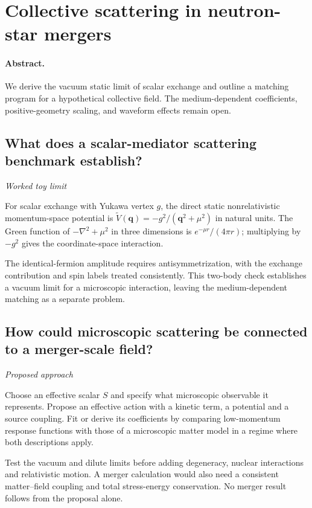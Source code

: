 \documentclass[11pt]{article}
\begin{document}
\section{Collective scattering in neutron-star mergers}
\paragraph{Abstract.} We derive the vacuum static limit of scalar exchange and outline a matching program for a hypothetical collective field. The medium-dependent coefficients, positive-geometry scaling, and waveform effects remain open.

\subsection{What does a scalar-mediator scattering benchmark establish?}
\label{problem:scalar-exchange}
\textit{Worked toy limit}

For scalar exchange with Yukawa vertex \(g\), the direct static nonrelativistic momentum-space potential is \(\widetilde V(\mathbf q)=-g^2/(\mathbf q^2+\mu^2)\) in natural units. The Green function of \(-\nabla^2+\mu^2\) in three dimensions is \(e^{-\mu r}/(4\pi r)\); multiplying by \(-g^2\) gives the coordinate-space interaction.

The identical-fermion amplitude requires antisymmetrization, with the exchange contribution and spin labels treated consistently. This two-body check establishes a vacuum limit for a microscopic interaction, leaving the medium-dependent matching as a separate problem.

\subsection{How could microscopic scattering be connected to a merger-scale field?}
\label{problem:collective-proposal}
\textit{Proposed approach}

Choose an effective scalar \(S\) and specify what microscopic observable it represents. Propose an effective action with a kinetic term, a potential and a source coupling. Fit or derive its coefficients by comparing low-momentum response functions with those of a microscopic matter model in a regime where both descriptions apply.

Test the vacuum and dilute limits before adding degeneracy, nuclear interactions and relativistic motion. A merger calculation would also need a consistent matter--field coupling and total stress-energy conservation. No merger result follows from the proposal alone.
\end{document}

